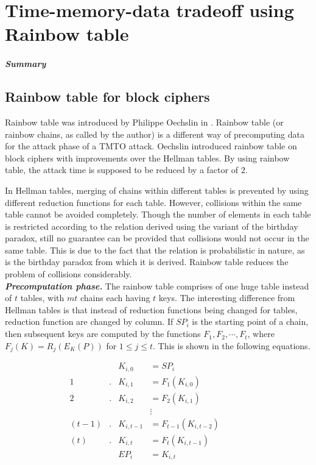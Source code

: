 \chapter{Time-memory-data tradeoff using Rainbow table}
\label{chapter:tmdto-rainbow}

\paragraph{Summary}


\section{Rainbow table for block ciphers}
\label{sec:rainbow-block}

Rainbow table was introduced by Philippe Oechslin in \cite{oechslin:mfc}. Rainbow table (or rainbow chains, as called by the author) is a different way of precomputing data for the attack phase of a TMTO attack. Oechslin introduced rainbow table on block ciphers with improvements over the Hellman tables. By using rainbow table, the attack time is supposed to be reduced by a factor of $2$.

In Hellman tables, merging of chains within different tables is prevented by using different reduction functions for each table. However, collisions within the same table cannot be avoided completely. Though the number of elements in each table is restricted according to the relation derived using the variant of the birthday paradox, still no guarantee can be provided that collisions would not occur in the same table. This is due to the fact that the relation is probabilistic in nature, as is the birthday paradox from which it is derived. Rainbow table reduces the problem of collisions considerably.\\

\noindent \textit{\textbf{Precomputation phase.}} The rainbow table comprises of one huge table instead of $t$ tables, with $mt$ chains each having $t$ keys. The interesting difference from Hellman tables is that instead of reduction functions being changed for tables, reduction function are changed by column. If $SP_i$ is the starting point of a chain, then subsequent keys are computed by the functions \mbox{$F_1, F_2, \cdots, F_t$}, where $F_j(K) = R_j(E_{K}(P))$ for $1 \leq j \leq t$. This is shown in the following equations. 

\begin{align*}
& & K_{i,0} & = SP_i & & & &\\
1&. &K_{i,1} & = F_1(K_{i,0}) & & & &\\
2&. &K_{i,2} & = F_2(K_{i,1}) & & & &\\
& & &\vdots & & & &\\
(t-1)&. &K_{i,t-1} & = F_{t-1}(K_{i,t-2}) & & & &\\
(t)&. &K_{i,t} & = F_t(K_{i,t-1}) & & & &\\
& & EP_i & = K_{i,t} & & & &\\
\end{align*}

